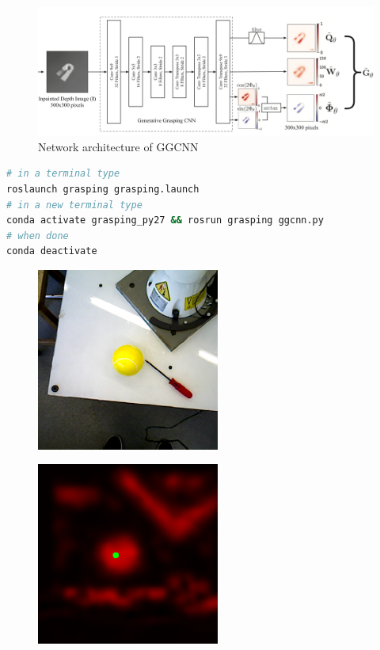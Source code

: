 \documentclass[headsepline,footinclude=false,fontsize=11pt,paper=a4,listof=totoc,bibliography=totoc,BCOR=12mm,DIV=14]{scrbook}
\begin{document}
\begin{figure}[h]
    \centering
    \includegraphics[width=15cm]{images/arch}
    \caption{Network architecture of GGCNN \cite{Grasping}}
    \label{fig:arch}
\end{figure}

\begin{lstlisting}[language=bash, caption={Launching grasp prediction node}]
# in a terminal type
roslaunch grasping grasping.launch
# in a new terminal type
conda activate grasping_py27 && rosrun grasping ggcnn.py
# when done 
conda deactivate
\end{lstlisting}

\newpage
\begin{figure} [h]
\centering
\begin{minipage}{.4\textwidth}
  \centering
  \includegraphics[height=6cm]{figures/pred_ball_rgb}
\end{minipage}
\begin{minipage}{.4\textwidth}
  \centering
  \includegraphics[height=6cm]{figures/pred_ball}
  \label{img:ball_pred}
\end{minipage}
\end{figure}
\end{document}
